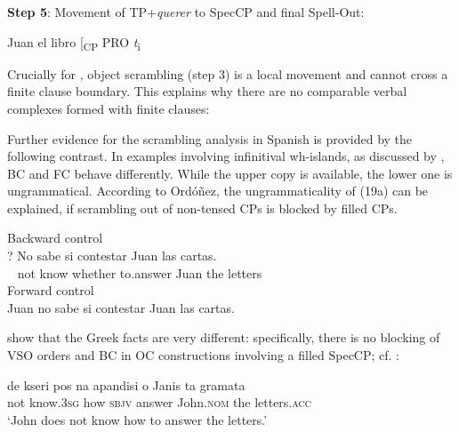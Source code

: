 \documentclass[output=paper]{langsci/langscibook}
\begin{document}
    \textsf{\bfseries Step 5}: Movement of TP+\textit{querer} to SpecCP and final Spell-Out:
    \begin{xlista}
    \setcounter{xnumii}{5}
    \ex\relax [\textsubscript{CP} [\textsubscript{TP} querer\textsubscript{i} [\textsubscript{VP} \textit{t} [\textsubscript{VP} comprar \textit{t}\textsubscript{i]}] Juan el libro [\textsubscript{CP} PRO \textit{t}\textsubscript{i}
    \end{xlista}
    \z

Crucially for \citet{Ordóñez2009}, object scrambling (step 3) is a local movement and cannot cross a finite clause boundary. This explains why there are no comparable verbal complexes formed with finite clauses:

\ea%
    \label{ex:alexiadou:19}
    \z
\z
    
Further evidence for the scrambling analysis in Spanish is provided by the following contrast. In examples involving infinitival wh-islands, as discussed by \citet{Torrego1996}, BC and FC behave differently. While the upper copy is available, the lower one is ungrammatical. According to Ordóñez, the ungrammaticality of (19a) can be explained, if scrambling out of non-tensed CPs is blocked by filled CPs.

\ea%
    \label{ex:alexiadou:20}
    \ea Backward control\\
    \gll*? No sabe   si   contestar Juan las cartas. \\
         ~    not   know whether to.answer Juan the letters\\
    \ex Forward control\\Juan no sabe si contestar Juan las cartas.
    \z
\z
           

\citet{Tsakali2017} show that the Greek facts are very different: specifically, there is no blocking of VSO orders and BC in OC constructions involving a filled SpecCP; cf. :

\ea%
    \label{ex:alexiadou:21}
    \gll de kseri          pos na apandisi     {o Janis}   ta gramata    \\
          not know{}.\textsc{3sg} how \textsc{sbjv} answer   John{}.\textsc{nom}   the letters{}.\textsc{acc}\\
    \glt  ‘John does not know how to answer the letters.’
    \z
\end{document}
